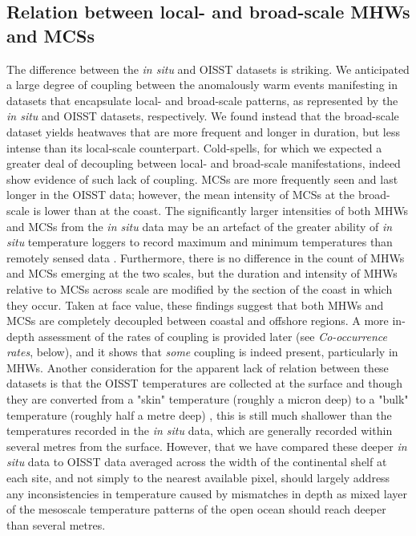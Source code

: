 \documentclass[a4paper,10pt,review]{elsarticle}
\begin{document}
\subsection{Relation between local- and broad-scale MHWs and MCSs}
The difference between the \emph{in situ} and OISST datasets is striking. We anticipated a large degree of coupling between the anomalously warm events manifesting in datasets that encapsulate local- and broad-scale patterns, as represented by the \emph{in situ} and OISST datasets, respectively. We found instead that the broad-scale dataset yields heatwaves that are more frequent and longer in duration, but less intense than its local-scale counterpart. Cold-spells, for which we expected a greater deal of decoupling between local- and broad-scale manifestations, indeed show evidence of such lack of coupling. MCSs are more frequently seen and last longer in the OISST data; however, the mean intensity of MCSs at the broad-scale is lower than at the coast. The significantly larger intensities of both MHWs and MCSs from the \emph{in situ} data may be an artefact of the greater ability of \emph{in situ} temperature loggers to record maximum and minimum temperatures than remotely sensed data \citep{Smale2009}. Furthermore, there is no difference in the count of MHWs and MCSs emerging at the two scales, but the duration and intensity of MHWs relative to MCSs across scale are modified by the section of the coast in which they occur. Taken at face value, these findings suggest that both MHWs and MCSs are completely decoupled between coastal and offshore regions. A more in-depth assessment of the rates of coupling is provided later (see \emph{Co-occurrence rates}, below), and it shows that \emph{some} coupling is indeed present, particularly in MHWs. Another consideration for the apparent lack of relation between these datasets is that the OISST temperatures are collected at the surface and though they are converted from a "skin" temperature (roughly a micron deep) to a "bulk" temperature (roughly half a metre deep) \citep{Reynolds2007}, this is still much shallower than the temperatures recorded in the \emph{in situ} data, which are generally recorded within several metres from the surface. However, that we have compared these deeper \emph{in situ} data to OISST data averaged across the width of the continental shelf at each site, and not simply to the nearest available pixel, should largely address any inconsistencies in temperature caused by mismatches in depth as mixed layer of the mesoscale temperature patterns of the open ocean should reach deeper than several metres.
\end{document}
